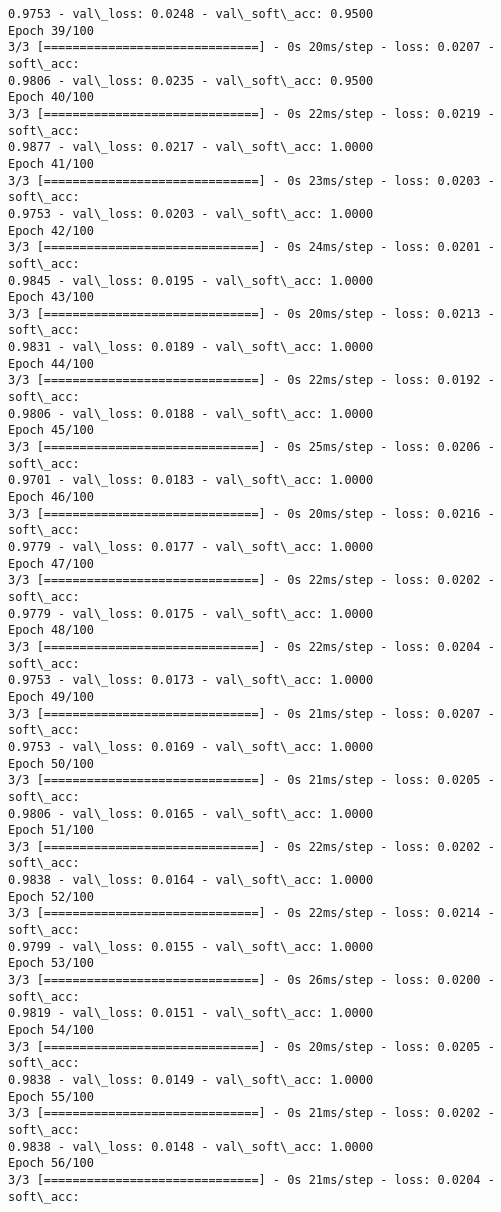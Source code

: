 \documentclass[11pt]{article}
\begin{document}
\begin{Verbatim}[commandchars=\\\{\}]
0.9753 - val\_loss: 0.0248 - val\_soft\_acc: 0.9500
Epoch 39/100
3/3 [==============================] - 0s 20ms/step - loss: 0.0207 - soft\_acc:
0.9806 - val\_loss: 0.0235 - val\_soft\_acc: 0.9500
Epoch 40/100
3/3 [==============================] - 0s 22ms/step - loss: 0.0219 - soft\_acc:
0.9877 - val\_loss: 0.0217 - val\_soft\_acc: 1.0000
Epoch 41/100
3/3 [==============================] - 0s 23ms/step - loss: 0.0203 - soft\_acc:
0.9753 - val\_loss: 0.0203 - val\_soft\_acc: 1.0000
Epoch 42/100
3/3 [==============================] - 0s 24ms/step - loss: 0.0201 - soft\_acc:
0.9845 - val\_loss: 0.0195 - val\_soft\_acc: 1.0000
Epoch 43/100
3/3 [==============================] - 0s 20ms/step - loss: 0.0213 - soft\_acc:
0.9831 - val\_loss: 0.0189 - val\_soft\_acc: 1.0000
Epoch 44/100
3/3 [==============================] - 0s 22ms/step - loss: 0.0192 - soft\_acc:
0.9806 - val\_loss: 0.0188 - val\_soft\_acc: 1.0000
Epoch 45/100
3/3 [==============================] - 0s 25ms/step - loss: 0.0206 - soft\_acc:
0.9701 - val\_loss: 0.0183 - val\_soft\_acc: 1.0000
Epoch 46/100
3/3 [==============================] - 0s 20ms/step - loss: 0.0216 - soft\_acc:
0.9779 - val\_loss: 0.0177 - val\_soft\_acc: 1.0000
Epoch 47/100
3/3 [==============================] - 0s 22ms/step - loss: 0.0202 - soft\_acc:
0.9779 - val\_loss: 0.0175 - val\_soft\_acc: 1.0000
Epoch 48/100
3/3 [==============================] - 0s 22ms/step - loss: 0.0204 - soft\_acc:
0.9753 - val\_loss: 0.0173 - val\_soft\_acc: 1.0000
Epoch 49/100
3/3 [==============================] - 0s 21ms/step - loss: 0.0207 - soft\_acc:
0.9753 - val\_loss: 0.0169 - val\_soft\_acc: 1.0000
Epoch 50/100
3/3 [==============================] - 0s 21ms/step - loss: 0.0205 - soft\_acc:
0.9806 - val\_loss: 0.0165 - val\_soft\_acc: 1.0000
Epoch 51/100
3/3 [==============================] - 0s 22ms/step - loss: 0.0202 - soft\_acc:
0.9838 - val\_loss: 0.0164 - val\_soft\_acc: 1.0000
Epoch 52/100
3/3 [==============================] - 0s 22ms/step - loss: 0.0214 - soft\_acc:
0.9799 - val\_loss: 0.0155 - val\_soft\_acc: 1.0000
Epoch 53/100
3/3 [==============================] - 0s 26ms/step - loss: 0.0200 - soft\_acc:
0.9819 - val\_loss: 0.0151 - val\_soft\_acc: 1.0000
Epoch 54/100
3/3 [==============================] - 0s 20ms/step - loss: 0.0205 - soft\_acc:
0.9838 - val\_loss: 0.0149 - val\_soft\_acc: 1.0000
Epoch 55/100
3/3 [==============================] - 0s 21ms/step - loss: 0.0202 - soft\_acc:
0.9838 - val\_loss: 0.0148 - val\_soft\_acc: 1.0000
Epoch 56/100
3/3 [==============================] - 0s 21ms/step - loss: 0.0204 - soft\_acc:

\end{Verbatim}
\end{document}
